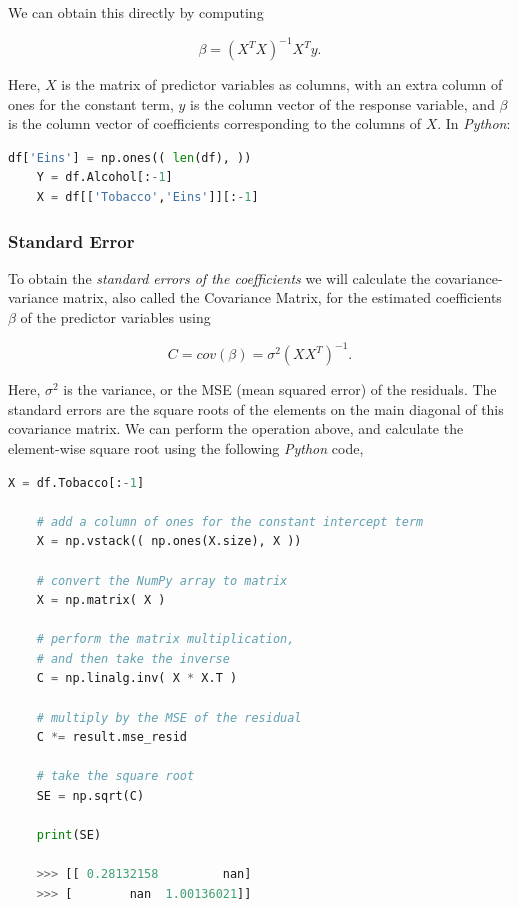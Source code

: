We can obtain this directly by computing

\begin{equation}
    \beta = (X^{T}X)^{-1}X^{T}y.
\end{equation}

Here, $X$ is the matrix of predictor variables as columns, with an extra column of ones for the constant term, $y$ is the column vector of the response variable, and $\beta$ is the column vector of coefficients corresponding to the columns of $X$. In \emph{Python}:

\begin{lstlisting}[language=Python]
    df['Eins'] = np.ones(( len(df), ))
    Y = df.Alcohol[:-1]
    X = df[['Tobacco','Eins']][:-1]
\end{lstlisting}


\subsubsection{Standard Error}

To obtain the \emph{standard errors of the coefficients} we will calculate the covariance-variance matrix, also called the Covariance Matrix, for the estimated coefficients $\beta$ of the predictor variables using

\begin{equation}
    C = cov(\beta) = \sigma^{2} ( X X^{T} )^{-1}.
\end{equation}

Here, $\sigma^{2}$ is the variance, or the MSE (mean squared error) of the residuals. The standard errors are the square roots of the elements on the main diagonal of this covariance matrix. We can perform the operation above, and calculate the element-wise square root using the following \emph{Python} code,

\begin{lstlisting}[language=Python]
    X = df.Tobacco[:-1]

    # add a column of ones for the constant intercept term
    X = np.vstack(( np.ones(X.size), X ))

    # convert the NumPy array to matrix
    X = np.matrix( X )

    # perform the matrix multiplication,
    # and then take the inverse
    C = np.linalg.inv( X * X.T )

    # multiply by the MSE of the residual
    C *= result.mse_resid

    # take the square root
    SE = np.sqrt(C)

    print(SE)

    >>> [[ 0.28132158         nan]
    >>> [        nan  1.00136021]]

\end{lstlisting}

